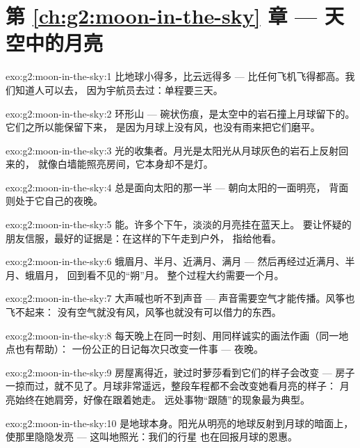 \section*{第 \ref{ch:g2:moon-in-the-sky} 章 --- 天空中的月亮}

\begin{solution}{exo:g2:moon-in-the-sky:1}
比地球小得多，比云远得多 ---
比任何飞机飞得都高。我们知道人可以去，
因为宇航员去过：单程要三天。
\end{solution}

\begin{solution}{exo:g2:moon-in-the-sky:2}
环形山 --- 碗状伤痕，是太空中的岩石撞上月球留下的。
它们之所以能保留下来，
是因为月球上没有风，也没有雨来把它们磨平。
\end{solution}

\begin{solution}{exo:g2:moon-in-the-sky:3}
光的收集者。月光是太阳光从月球灰色的岩石上反射回来的，
就像白墙能照亮房间，它本身却不是灯。
\end{solution}

\begin{solution}{exo:g2:moon-in-the-sky:4}
总是面向太阳的那一半 --- 朝向太阳的一面明亮，
背面则处于它自己的夜晚。
\end{solution}

\begin{solution}{exo:g2:moon-in-the-sky:5}
能。许多个下午，淡淡的月亮挂在蓝天上。
要让怀疑的朋友信服，最好的证据是：在这样的下午走到户外，
指给他看。
\end{solution}

\begin{solution}{exo:g2:moon-in-the-sky:6}
蛾眉月、半月、近满月、满月 --- 然后再经过近满月、半月、蛾眉月，
回到看不见的“朔”月。
整个过程大约需要一个月。
\end{solution}

\begin{solution}{exo:g2:moon-in-the-sky:7}
大声喊也听不到声音 --- 声音需要空气才能传播。风筝也飞不起来：
没有空气就没有风，风筝也就没有可以借力的东西。
\end{solution}

\begin{solution}{exo:g2:moon-in-the-sky:8}
每天晚上在同一时刻、用同样诚实的画法作画（同一地点也有帮助）：
一份公正的日记每次只改变一件事 ---
夜晚。
\end{solution}

\begin{solution}{exo:g2:moon-in-the-sky:9}
房屋离得近，驶过时萝莎看到它们的样子会改变 ---
房子一掠而过，就不见了。月球非常遥远，整段车程都不会改变她看月亮的样子：
月亮始终在她肩旁，好像在跟着她走。
远处事物“跟随”的现象最为典型。
\end{solution}

\begin{solution}{exo:g2:moon-in-the-sky:10}
是地球本身。阳光从明亮的地球反射到月球的暗面上，
使那里隐隐发亮 --- 这叫地照光：我们的行星
也在回报月球的恩惠。
\end{solution}
